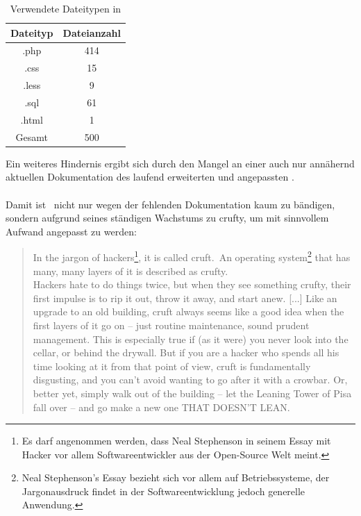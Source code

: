 \begin{table}
	\centering
	\begin{tabular}{|c|c|}
		\hline 
		Dateityp	& Dateianzahl \\ 
		\hline 
		.php		& 414 \\ 
		\hline 
		.css		& 15 \\ 
		\hline 
		.less		& 9 \\ 
		\hline 
		.sql		& 61 \\ 
		\hline 
		.html		& 1 \\ 
		\hline
		\hline 
		Gesamt		& 500 \\ 
		\hline 
	\end{tabular}

	\label{tbl_ost_dateianzahl}
	\caption{Verwendete Dateitypen in \getOst}
\end{table}

Ein weiteres Hindernis ergibt sich durch den Mangel an einer auch nur annähernd aktuellen Dokumentation des laufend erweiterten und angepassten \getOst.
\paragraph{}
Damit ist \getOst\ nicht nur wegen der fehlenden Dokumentation kaum zu bändigen, sondern aufgrund seines ständigen Wachstums zu \glqq crufty\grqq , um mit sinnvollem Aufwand angepasst zu werden:

\blockcquote{cmdlinestephenson}{
	 In the jargon of hackers\footnote{Es darf angenommen werden, dass Neal Stephenson in seinem Essay mit Hacker vor allem Softwareentwickler aus der Open-Source Welt meint.}, it is called
	\glqq cruft.\grqq\ An operating system\footnote{Neal Stephenson's Essay bezieht sich vor allem auf Betriebssysteme, der Jargonausdruck findet in der Softwareentwicklung jedoch generelle Anwendung.} that has many, many layers of it is described as \glqq crufty.\grqq \\
	Hackers hate to do things twice, but when they see something crufty, their first impulse
	is to rip it out, throw it away, and start anew.
	[...]
	Like an upgrade to an old building, cruft always seems like a good idea when the first layers of it go on – just routine maintenance, sound prudent management. This is especially true if (as it were) you never look into the cellar, or behind the drywall. But if you are a hacker who spends all his time looking at it from that point of view, cruft is fundamentally disgusting, and you can’t avoid wanting to go after it with a crowbar. Or, better yet, simply walk out of the building – let the Leaning Tower of Pisa fall over – and go make a new one THAT DOESN’T LEAN.
}


